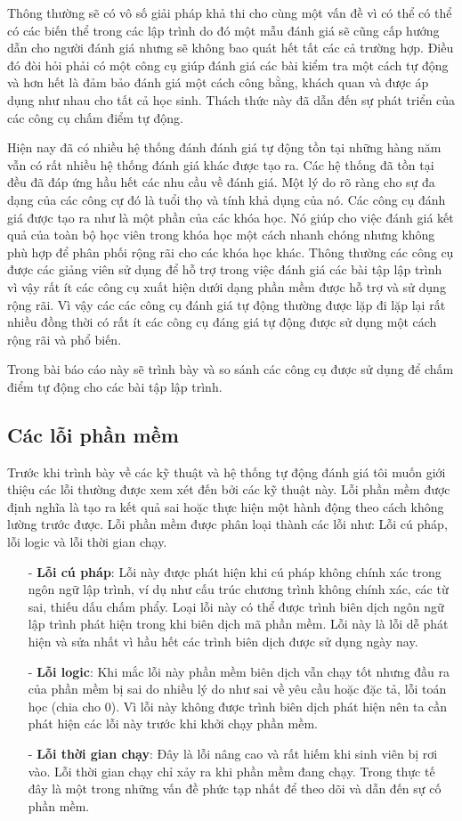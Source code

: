 \documentclass[12pt,a4paper]{article}
\begin{document}
\indent Thông thường sẽ có vô số giải pháp khả thi cho cùng một vấn đề vì có thể có thể có các biến thể trong các lập trình do đó một mẫu đánh giá sẽ cũng cấp hướng dẫn cho người đánh giá nhưng sẽ không bao quát hết tất các cả trường hợp. Điều đó đòi hỏi phải có một công cụ giúp đánh giá các bài kiểm tra một cách tự động và hơn hết là đảm bảo đánh giá một cách công bằng, khách quan và được áp dụng như nhau cho tất cả học sinh. Thách thức này đã dẫn đến sự phát triển của các công cụ chấm điểm tự động.

\indent Hiện nay đã có nhiều hệ thống đánh đánh giá tự động tồn tại những hàng năm vẫn có rất nhiều hệ thống đánh giá khác được tạo ra. Các hệ thống đã tồn tại đều đã đáp ứng hầu hết các nhu cầu về đánh giá.
Một lý do rõ ràng cho sự đa dạng của các công cự đó là tuổi thọ và tính khả dụng của nó. Các công cụ đánh giá được tạo ra như là một phần của các khóa học. Nó giúp cho việc đánh giá kết quả của toàn bộ học viên trong khóa học một cách nhanh chóng nhưng không phù hợp để phân phối rộng rãi cho các khóa học khác. Thông thường các công cụ được các giảng viên sử dụng để hỗ trợ trong việc đánh giá các bài tập lập trình vì vậy rất ít các công cụ xuất hiện dưới dạng phần mềm được hỗ trợ và sử dụng rộng rãi. Vì vậy các các công cụ đánh giá tự động thường được lặp đi lặp lại rất nhiều đồng thời có rất ít các công cụ đáng giá tự động được sử dụng một cách rộng rãi và phổ biến.

\indent  Trong bài báo cáo này sẽ trình bày và so sánh các công cụ được sử dụng để chấm điểm tự động cho các bài tập lập trình.

\subsection{Các lỗi phần mềm}
Trước khi trình bày về các kỹ thuật và hệ thống tự động đánh giá tôi muốn giới thiệu các lỗi thường được xem xét đến bởi các kỹ thuật này. Lỗi phần mềm được định nghĩa là tạo ra kết quả sai hoặc thực hiện một hành động theo cách không lường trước được. Lỗi phần mềm được phân loại thành các lỗi như: Lỗi cú pháp, lỗi logic và lỗi thời gian chạy.

\begin{itemize}
\item[-] \textbf{Lỗi cú pháp}: Lỗi này được phát hiện khi cú pháp không chính xác trong ngôn ngữ lập trình, ví dụ như cấu trúc chương trình không chính xác, các từ sai, thiếu dấu chấm phẩy. Loại lỗi này có thể được trình biên dịch ngôn ngữ lập trình phát hiện trong khi biên dịch mã phần mềm. Lỗi này là lỗi dễ phát hiện và sửa nhất vì hầu hết các trình biên dịch được sử dụng ngày nay.
\item[-] \textbf{Lỗi logic}: Khi mắc lỗi này phần mềm biên dịch vẫn chạy tốt nhưng đầu ra của phần mềm bị sai do nhiều lý do như sai về yêu cầu hoặc đặc tả, lỗi toán học (chia cho 0). Vì lỗi này không được trình biên dịch phát hiện nên ta cần phát hiện các lỗi này trước khi khởi chạy phần mềm.
\item[-] \textbf{Lỗi thời gian chạy}: Đây là lỗi nâng cao và rất hiếm khi sinh viên bị rơi vào. Lỗi thời gian chạy chỉ xảy ra khi phần mềm đang chạy. Trong thực tế đây là một trong những vấn đề phức tạp nhất để theo dõi và dẫn đến sự cố phần mềm.
\end{itemize}
\end{document}
